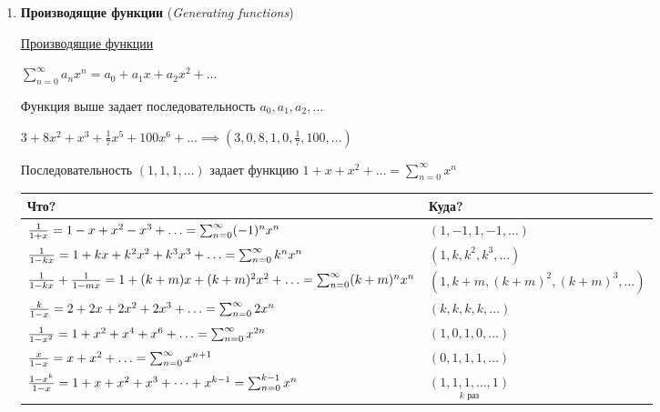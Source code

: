 \documentclass[12pt]{article}
\begin{document}
\begin{enumerate}
        \item \textbf{Производящие функции} (\textit{Generating functions})

        \hyperlink{generatingfunction}{Производящие функции}

        $\sum_{n = 0}^\infty a_n x^n = a_0 + a_1 x + a_2 x^2 + \dots$

        Функция выше задает последовательность $a_0, a_1, a_2, \dots$

        \Exs $3 + 8x^2 + x^3 + \frac{1}{7}x^5 + 100x^6 + \dots \implies (3, 0, 8, 1, 0, \frac{1}{7}, 100, \dots)$

        \Exs Последовательность $(1, 1, 1, \dots)$ задает функцию $1 + x + x^2 + \dots = \sum_{n = 0}^\infty x^n$

        {
        \footnotesize
        \begin{tabular}{p{}|p{}}
            \hline

            \hfil Что? & \hfil Куда? \\

            \hline
            $\frac{1}{1 + x} = 1 - x + x^2 - x^3 + \dots \hfill = \sum_{n = 0}^\infty (-1)^n x^n$ & $(1, -1, 1, -1, \dots)$ \\

            $\frac{1}{1 - kx} = 1 + kx + k^2 x^2 + k^3 x^3 + \dots \hfill = \sum_{n = 0}^\infty k^n x^n$ & $(1, k, k^2, k^3, \dots)$ \\

            $\frac{1}{1 - kx} + \frac{1}{1 - mx} = 1 + (k + m)x + (k + m)^2 x^2 + \dots \hfill = \sum_{n = 0}^\infty (k + m)^n x^n$ & $(1, k + m, (k + m)^2, (k + m)^3, \dots)$ \\

            $\frac{k}{1 - x} = 2 + 2x + 2x^2 + 2x^3 + \dots \hfill = \sum_{n = 0}^\infty 2 x^n$ & $(k, k, k, k, \dots)$ \\

            $\frac{1}{1 - x^2} = 1 + x^2 + x^4 + x^6 + \dots \hfill = \sum_{n = 0}^\infty x^{2n}$ & $(1, 0, 1, 0, \dots)$ \\

            $\frac{x}{1 - x} = x + x^2 + \dots \hfill = \sum_{n = 0}^\infty x^{n + 1}$ & $(0, 1, 1, 1, \dots)$ \\

            $\frac{1 - x^k}{1 - x} = 1 + x + x^2 + x^3 + \dots + x^{k - 1} \hfill = \sum_{n = 0}^{k - 1} x^n$ & $\underset{k \text{ раз}}{(1, 1, 1, \dots, 1)}$ \\


\end{tabular}}
\end{enumerate}
\end{document}
